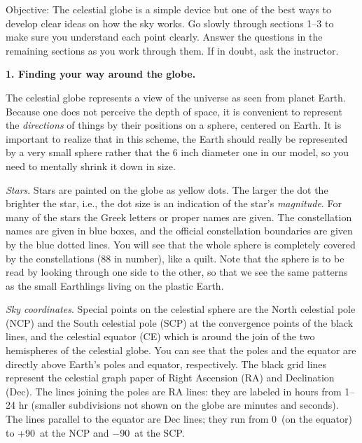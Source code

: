 

\bigskip

\noindent
{Objective:} The celestial globe is a simple device but one of the
best ways to develop clear ideas on how the sky works. Go slowly
through sections 1--3 to make sure you understand each point
clearly. Answer the questions in the remaining sections as you work
through them. If in doubt, ask the instructor.

\medskip
\noindent
{\bf 1. Finding your way around the globe.}

\medskip
\noindent
The celestial globe represents a view of the universe as seen from planet
Earth. Because one does not perceive the depth of space, it is
convenient to represent the \emph{directions} of things by their
positions on a sphere, centered on Earth. It is important to realize
that in this scheme, the Earth should really be represented by a
very small sphere rather that the 6 inch diameter one in our
model, so you need to mentally shrink it down in size.

\medskip\noindent
\emph{Stars}. Stars are painted on the globe as yellow dots. The
larger the dot the brighter the star, i.e., the dot size is an
indication of the star's \emph{magnitude}. For many of the stars the
Greek letters or proper names are given.  The constellation names are
given in blue boxes, and the official constellation boundaries are
given by the blue dotted lines. You will see that the whole sphere is
completely covered by the constellations (88 in number), like a
quilt. Note that the sphere is to be read by looking through one side
to the other, so that we see the same patterns as the small Earthlings
living on the plastic Earth.

\medskip\noindent
\emph{Sky coordinates}. Special points on the celestial sphere are the
North celestial pole (NCP) and the South celestial pole (SCP) at the
convergence points of the black lines, and the celestial equator (CE)
which is around the join of the two hemispheres of the celestial
globe. You can see that the poles and the equator are directly above
Earth's poles and equator, respectively.  The black grid lines
represent the celestial graph paper of Right Ascension (RA) and
Declination (Dec). The lines joining the poles are RA lines: they are
labeled in hours from 1--24 hr (smaller subdivisions not shown on the
globe are minutes and seconds). The lines parallel to the equator are
Dec lines; they run from 0\deg\ (on the equator) to +90\deg\ at the
NCP and $-$90\deg\ at the SCP.

